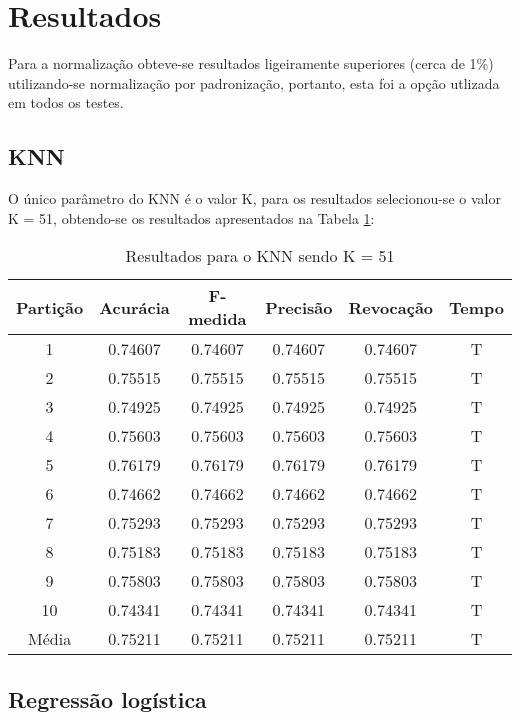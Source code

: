 \section{Resultados}

Para a normalização obteve-se resultados ligeiramente superiores (cerca de 1\%) utilizando-se normalização por padronização, portanto, esta foi a opção utlizada em todos os testes.

\subsection{KNN}

O único parâmetro do KNN é o valor K, para os resultados selecionou-se o valor K = 51, obtendo-se os resultados apresentados na Tabela \ref{table:resultadosKNN}:

\begin{table}[h]
\centering
\caption{Resultados para o KNN sendo K = 51}
\vspace{0.2cm}
\begin{tabular}{c|c|c|c|c|c}
Partição & Acurácia & F-medida & Precisão & Revocação & Tempo \\
\hline
1  & 0.74607 & 0.74607 & 0.74607 & 0.74607 & T \\     
2  & 0.75515 & 0.75515 & 0.75515 & 0.75515 & T \\     
3  & 0.74925 & 0.74925 & 0.74925 & 0.74925 & T \\     
4  & 0.75603 & 0.75603 & 0.75603 & 0.75603 & T \\     
5  & 0.76179 & 0.76179 & 0.76179 & 0.76179 & T \\     
6  & 0.74662 & 0.74662 & 0.74662 & 0.74662 & T \\     
7  & 0.75293 & 0.75293 & 0.75293 & 0.75293 & T \\     
8  & 0.75183 & 0.75183 & 0.75183 & 0.75183 & T \\     
9  & 0.75803 & 0.75803 & 0.75803 & 0.75803 & T \\     
10 & 0.74341 & 0.74341 & 0.74341 & 0.74341 & T \\
\hline
Média & 0.75211 & 0.75211 & 0.75211 & 0.75211 & T

\end{tabular} 
\label{table:resultadosKNN}
\end{table}

\subsection{Regressão logística}

